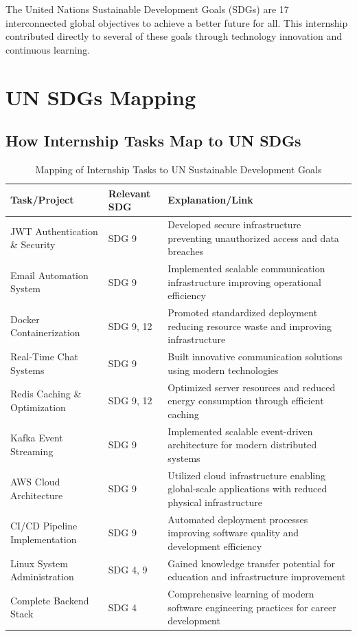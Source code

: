 
The United Nations Sustainable Development Goals (SDGs) are 17 interconnected global objectives to achieve a better future for all. This internship contributed directly to several of these goals through technology innovation and continuous learning.

\section{UN SDGs Mapping}

\subsection{How Internship Tasks Map to UN SDGs}

\begin{table}[h]
    \centering
    \begin{tabularx}{\textwidth}{|l|l|X|}
        \hline
        \textbf{Task/Project} & \textbf{Relevant SDG} & \textbf{Explanation/Link} \\
        \hline
        JWT Authentication \& Security & SDG 9 & Developed secure infrastructure preventing unauthorized access and data breaches \\
        \hline
        Email Automation System & SDG 9 & Implemented scalable communication infrastructure improving operational efficiency \\
        \hline
        Docker Containerization & SDG 9, 12 & Promoted standardized deployment reducing resource waste and improving infrastructure \\
        \hline
        Real-Time Chat Systems & SDG 9 & Built innovative communication solutions using modern technologies \\
        \hline
        Redis Caching \& Optimization & SDG 9, 12 & Optimized server resources and reduced energy consumption through efficient caching \\
        \hline
        Kafka Event Streaming & SDG 9 & Implemented scalable event-driven architecture for modern distributed systems \\
        \hline
        AWS Cloud Architecture & SDG 9 & Utilized cloud infrastructure enabling global-scale applications with reduced physical infrastructure \\
        \hline
        CI/CD Pipeline Implementation & SDG 9 & Automated deployment processes improving software quality and development efficiency \\
        \hline
        Linux System Administration & SDG 4, 9 & Gained knowledge transfer potential for education and infrastructure improvement \\
        \hline
        Complete Backend Stack & SDG 4 & Comprehensive learning of modern software engineering practices for career development \\
        \hline
    \end{tabularx}
    \caption{Mapping of Internship Tasks to UN Sustainable Development Goals}
\end{table}

